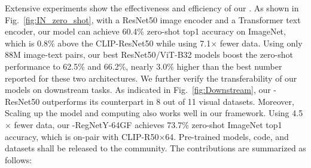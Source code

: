 Extensive experiments show the effectiveness and efficiency of our \workname. As shown in Fig.~\ref{fig:IN_zero_shot}, with a ResNet50 image encoder and a Transformer text encoder, 
our model can achieve 60.4\% zero-shot top1 accuracy on ImageNet, which is 0.8\% above the CLIP-ResNet50 while using 7.1$\times$ fewer data. 
Using only 88M image-text pairs, our best ResNet50/ViT-B32 models boost the zero-shot performance to 62.5\% and 66.2\%, nearly 3.0\% higher than the best number reported for these two architectures. 
We further verify the transferability of our models on downstream tasks.
As indicated in Fig.~\ref{fig:Downstream}, our \workname-ResNet50 outperforms its counterpart in 8 out of 11 visual datasets.
Moreover, Scaling up the model and computing also works well in our framework. 
Using 4.5$\times$ fewer data, our \workname-RegNetY-64GF achieves 73.7\% zero-shot ImageNet top1 accuracy, which is on-pair with CLIP-R50$\times$64.
Pre-trained models, code, and datasets shall be released to the community. The contributions are summarized as follows:







